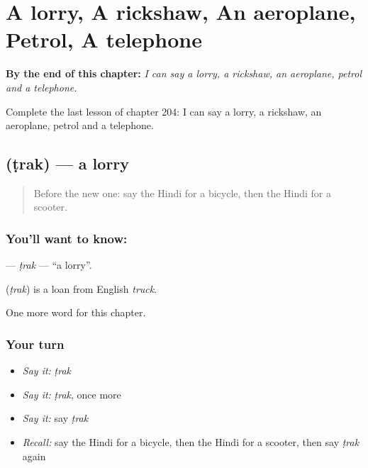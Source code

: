 
\chapter{A lorry, A rickshaw, An aeroplane, Petrol, A telephone}
\label{ch:hi-a-lorry-a-rickshaw-an-aeroplane-petrol-a-telephone}

\begin{chapteropening}
\textbf{By the end of this chapter:} \emph{I can say a lorry, a rickshaw, an aeroplane, petrol and a telephone.}

Complete the last lesson of chapter 204: I can say a lorry, a rickshaw, an aeroplane, petrol and a telephone.
\end{chapteropening}

\section[\texorpdfstring{\hi{ट्रक} (ṭrak)}{ट्रक (ṭrak)}]{ (ṭrak) — a lorry}

\label{lesson:HI-C204-trak}



\begin{quote}
Before the new one: say the Hindi for a bicycle, then the Hindi for a scooter.
\end{quote}

\subsection*{You'll want to know: }
\textbf{} — \emph{ṭrak} — \textquotedblleft{}a lorry\textquotedblright{}.

\begin{cousinweb}
\textbf{} (\emph{ṭrak}) is a loan from English \emph{truck}.
\end{cousinweb}

\begin{grammarlens}[title={What you've built}]
One more word for this chapter.
\end{grammarlens}

\subsection*{Your turn}
\begin{itemize}
\raggedright
  \item \emph{Say it:} \emph{ṭrak}
  \item \emph{Say it:} \emph{ṭrak}, once more
  \item \emph{Say it:} say \emph{ṭrak}
  \item \emph{Recall:} say the Hindi for a bicycle, then the Hindi for a scooter, then say \emph{ṭrak} again
\end{itemize}


